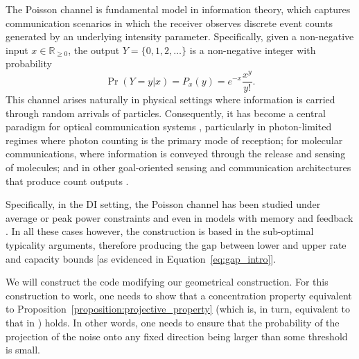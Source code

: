 \documentclass[10pt, conference]{IEEEtran}
\newcommand{\1}{\mathds{1}}
\newcommand{\RR}{\mathbb{R}}
\begin{document}
The Poisson channel is fundamental model in information theory, which captures communication scenarios in which the receiver observes discrete event counts generated by an underlying intensity parameter. Specifically, given a non-negative input $x\in\RR_{\geq 0}$, the output $Y=\{0,1,2,\dots\}$ is a non-negative integer with probability
\begin{equation}\label{eq:poisson}
\Pr(Y=y|x)=P_x(y)=e^{-x}\frac{x^y}{y!}.
\end{equation}
This channel arises naturally in physical settings where information is carried through random arrivals of particles. Consequently, it has become a central paradigm for optical communication systems \cite{D:optical_coms,DP:optical_coms,MS:optical_coms}, particularly in photon-limited regimes where photon counting is the primary mode of reception; for molecular communications\cite{Review:molecular_coms,tutorial:molecular_coms}, where information is conveyed through the release and sensing of molecules; and in other goal-oriented sensing and communication architectures that produce count outputs \cite{Poisson-bits-through-queues,S:Poisson-like-process}.

Specifically, in the DI setting, the Poisson channel has been studied under average or peak power constraints \cite{DI-poisson_mc,CDBW:DI_classical} and even in models with memory and feedback \cite{DI-poisson-isi,ZCBD:DI_isi_feedback}. In all these cases however, the construction is based in the sub-optimal typicality arguments, therefore producing the gap between lower and upper rate and capacity bounds [as evidenced in Equation~\eqref{eq:gap_intro}]. 

We will construct the code modifying our geometrical construction. For this construction to work, one needs to show that a concentration property equivalent to Proposition~\ref{proposition:projective_property} (which is, in turn, equivalent to that in \cite[Prop.~2]{CDBW:Gauss}) holds. In other words, one needs to ensure that the probability of the projection of the noise onto any fixed direction being larger than some threshold is small. 
\end{document}
